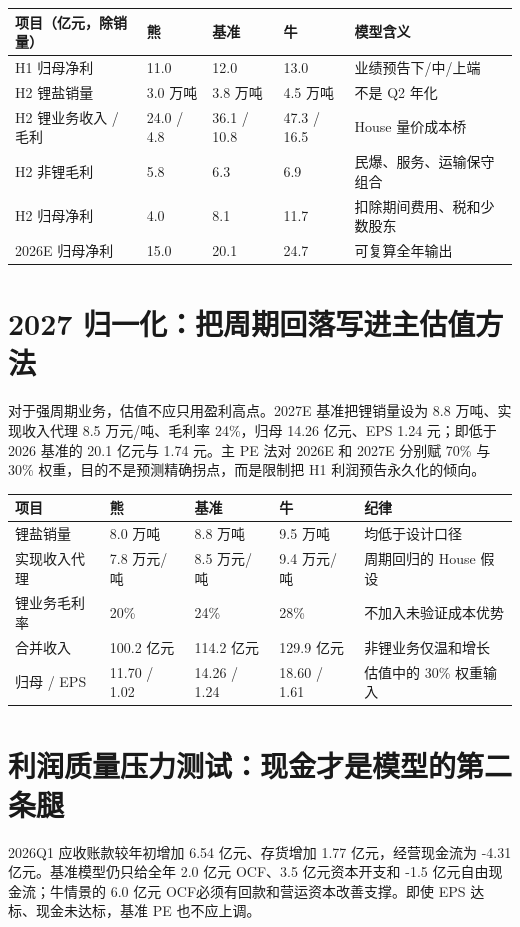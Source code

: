 \begin{exhibitbox}
\begin{tabularx}{\exhibitboxwidth}{L{3.0cm}R{2.0cm}R{2.0cm}R{2.0cm}X}
\toprule
项目（亿元，除销量） & 熊 & 基准 & 牛 & 模型含义 \\
\midrule
H1 归母净利 & 11.0 & 12.0 & 13.0 & 业绩预告下/中/上端 \\
H2 锂盐销量 & 3.0 万吨 & 3.8 万吨 & 4.5 万吨 & 不是 Q2 年化 \\
H2 锂业务收入 / 毛利 & 24.0 / 4.8 & 36.1 / 10.8 & 47.3 / 16.5 & House 量价成本桥 \\
H2 非锂毛利 & 5.8 & 6.3 & 6.9 & 民爆、服务、运输保守组合 \\
H2 归母净利 & 4.0 & 8.1 & 11.7 & 扣除期间费用、税和少数股东 \\
2026E 归母净利 & 15.0 & 20.1 & 24.7 & 可复算全年输出 \\
\bottomrule
\end{tabularx}
\end{exhibitbox}

\section{2027 归一化：把周期回落写进主估值方法}

对于强周期业务，估值不应只用盈利高点。2027E 基准把锂销量设为 8.8 万吨、实现收入代理 8.5 万元/吨、毛利率 24\%，归母 14.26 亿元、EPS 1.24 元；即低于 2026 基准的 20.1 亿元与 1.74 元。主 PE 法对 2026E 和 2027E 分别赋 70\% 与 30\% 权重，目的不是预测精确拐点，而是限制把 H1 利润预告永久化的倾向。

\begin{exhibitbox}
\begin{tabularx}{\exhibitboxwidth}{L{3.2cm}R{2.0cm}R{2.0cm}R{2.0cm}X}
\toprule
项目 & 熊 & 基准 & 牛 & 纪律 \\
\midrule
锂盐销量 & 8.0 万吨 & 8.8 万吨 & 9.5 万吨 & 均低于设计口径 \\
实现收入代理 & 7.8 万元/吨 & 8.5 万元/吨 & 9.4 万元/吨 & 周期回归的 House 假设 \\
锂业务毛利率 & 20\% & 24\% & 28\% & 不加入未验证成本优势 \\
合并收入 & 100.2 亿元 & 114.2 亿元 & 129.9 亿元 & 非锂业务仅温和增长 \\
归母 / EPS & 11.70 / 1.02 & 14.26 / 1.24 & 18.60 / 1.61 & 估值中的 30\% 权重输入 \\
\bottomrule
\end{tabularx}
\end{exhibitbox}

\section{利润质量压力测试：现金才是模型的第二条腿}

2026Q1 应收账款较年初增加 6.54 亿元、存货增加 1.77 亿元，经营现金流为 -4.31 亿元。基准模型仍只给全年 2.0 亿元 OCF、3.5 亿元资本开支和 -1.5 亿元自由现金流；牛情景的 6.0 亿元 OCF必须有回款和营运资本改善支撑。即使 EPS 达标、现金未达标，基准 PE 也不应上调。

